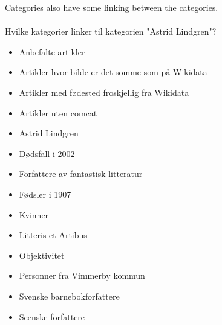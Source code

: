 \documentclass[11pt,english,a4paper]{article}
\begin{document}
Categories also have some linking between the categories. \\\\



Hvilke kategorier linker til kategorien "Astrid Lindgren"?
\begin{itemize}
\item Anbefalte artikler
\item Artikler hvor bilde er det somme som på Wikidata
\item Artikler med fødested froskjellig fra Wikidata
\item Artikler uten comcat
\item Astrid Lindgren
\item Dødsfall i 2002
\item Forfattere av fantastisk litteratur
\item Fødsler i 1907
\item Kvinner
\item Litteris et Artibus
\item Objektivitet
\item Personner fra Vimmerby kommun
\item Svenske barnebokforfattere
\item Scenske forfattere

\end{itemize}
\end{document}
